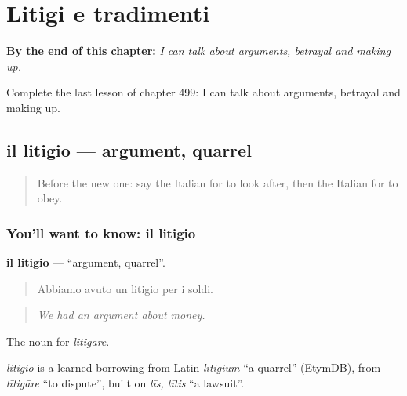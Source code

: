 
\chapter{Litigi e tradimenti}
\label{ch:it-litigi-e-tradimenti}

\begin{chapteropening}
\textbf{By the end of this chapter:} \emph{I can talk about arguments, betrayal and making up.}

Complete the last lesson of chapter 499: I can talk about arguments, betrayal and making up.
\end{chapteropening}

\section[il litigio]{il litigio — argument, quarrel}

\label{lesson:IT-C499-litigio}



\begin{quote}
Before the new one: say the Italian for to look after, then the Italian for to obey.
\end{quote}

\subsection*{You'll want to know: il litigio}
\textbf{il litigio} — \textquotedblleft{}argument, quarrel\textquotedblright{}.

\begin{quote}
Abbiamo avuto un litigio per i soldi.
\end{quote}

\begin{quote}
\emph{We had an argument about money.}
\end{quote}

The noun for \emph{litigare}.

\begin{cousinweb}
\emph{litigio} is a learned borrowing from Latin \emph{lītigium} \textquotedblleft{}a quarrel\textquotedblright{} (EtymDB), from \emph{lītigāre} \textquotedblleft{}to dispute\textquotedblright{}, built on \emph{līs, lītis} \textquotedblleft{}a lawsuit\textquotedblright{}.
\end{cousinweb}


